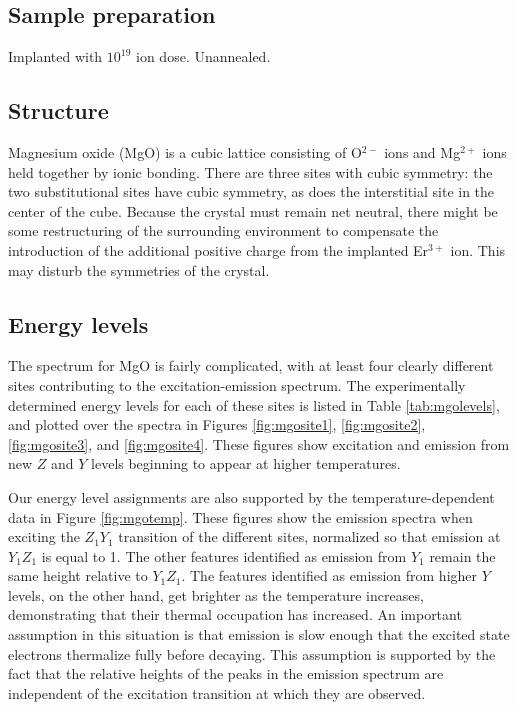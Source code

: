 \documentclass[12pt]{report}
\newcommand{\erbium}[1][ ]{Er$^{3+}$#1}
\begin{document}
\subsection{Sample preparation}
Implanted with $10^{19}$ ion dose. Unannealed.

\subsection{Structure}
Magnesium oxide (MgO) is a cubic lattice consisting of O$^{2-}$ ions and Mg$^{2+}$ ions held together by ionic bonding. There are three sites with cubic symmetry: the two substitutional sites have cubic symmetry, as does the interstitial site in the center of the cube. Because the crystal must remain net neutral, there might be some restructuring of the surrounding environment to compensate the introduction of the additional positive charge from the implanted \erbium ion. This may disturb the symmetries of the crystal.

\newpage 
\subsection{Energy levels}
The spectrum for MgO is fairly complicated, with at least four clearly different sites contributing to the excitation-emission spectrum. The experimentally determined energy levels for each of these sites is listed in Table \ref{tab:mgolevels}, and plotted over the spectra in Figures \ref{fig:mgosite1}, \ref{fig:mgosite2}, \ref{fig:mgosite3}, and \ref{fig:mgosite4}. These figures show excitation and emission from new $Z$ and $Y$ levels beginning to appear at higher temperatures.

Our energy level assignments are also supported by the temperature-dependent data in Figure \ref{fig:mgotemp}. These figures show the emission spectra when exciting the $Z_{1}Y_{1}$ transition of the different sites, normalized so that emission at $Y_{1}Z_{1}$ is equal to 1. The other features identified as emission from $Y_{1}$ remain the same height relative to $Y_{1}Z_{1}$. The features identified as emission from higher $Y$ levels, on the other hand, get brighter as the temperature increases, demonstrating that their thermal occupation has increased. An important assumption in this situation is that emission is slow enough that the excited state electrons thermalize fully before decaying. This assumption is supported by the fact that the relative heights of the peaks in the emission spectrum are independent of the excitation transition at which they are observed.
\end{document}
